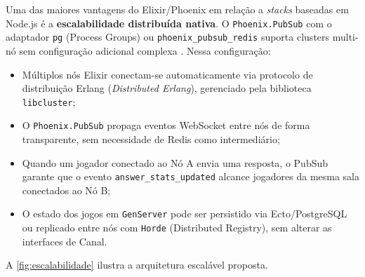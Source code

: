 \documentclass[
	12pt,
	openany,
	oneside,
	a4paper,
	english,
	brazil
]{abntex2}
\begin{document}
Uma das maiores vantagens do Elixir/Phoenix em relação a \textit{stacks} baseadas em Node.js é a \textbf{escalabilidade distribuída nativa}. O \texttt{Phoenix.PubSub} com o adaptador \texttt{pg} (Process Groups) ou \texttt{phoenix\_pubsub\_redis} suporta clusters multi-nó sem configuração adicional complexa \cite{phoenix2024}. Nessa configuração:

\begin{itemize}
  \item Múltiplos nós Elixir conectam-se automaticamente via protocolo de distribuição Erlang (\textit{Distributed Erlang}), gerenciado pela biblioteca \texttt{libcluster};
  \item O \texttt{Phoenix.PubSub} propaga eventos WebSocket entre nós de forma transparente, sem necessidade de Redis como intermediário;
  \item Quando um jogador conectado ao Nó A envia uma resposta, o PubSub garante que o evento \texttt{answer\_stats\_updated} alcance jogadores da mesma sala conectados ao Nó B;
  \item O estado dos jogos em \texttt{GenServer} pode ser persistido via Ecto/PostgreSQL ou replicado entre nós com \texttt{Horde} (Distributed Registry), sem alterar as interfaces de Canal.
\end{itemize}

A \autoref{fig:escalabilidade} ilustra a arquitetura escalável proposta.
\end{document}
